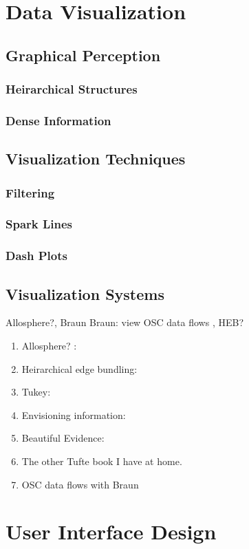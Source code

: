 \section{Data Visualization}
	\subsection{Graphical Perception}
		\subsubsection{Heirarchical Structures}
		\subsubsection{Dense Information}
	\subsection{Visualization Techniques}
		\subsubsection{Filtering}
		\subsubsection{Spark Lines}
		\subsubsection{Dash Plots}
	\subsection{Visualization Systems}
		Allosphere?, Braun Braun: view OSC data flows , HEB?
	\begin{enumerate}
		\item Allosphere? :
		\item Heirarchical edge bundling: 
		\item Tukey: 
		\item Envisioning information: 
		\item Beautiful Evidence: 
		\item The other Tufte book I have at home.
		\item OSC data flows with Braun 
	\end{enumerate}

\section{User Interface Design}

